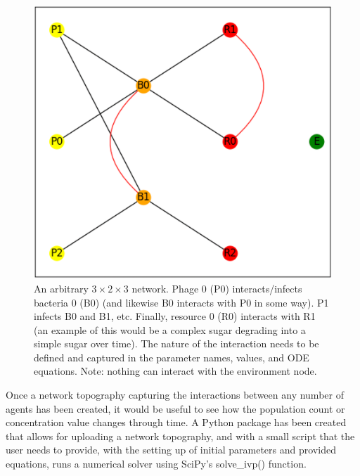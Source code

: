 \begin{figure}
    \centering
    \includegraphics[width=0.5\linewidth]{Chapters/Screenshots/example_network.png}
    \caption{An arbitrary $3\times2\times3$ network. Phage 0 (P0) interacts/infects bacteria 0 (B0) (and likewise B0 interacts with P0 in some way). P1 infects B0 and B1, etc. Finally, resource 0 (R0) interacts with R1 (an example of this would be a complex sugar degrading into a simple sugar over time). The nature of the interaction needs to be defined and captured in the parameter names, values, and ODE equations. Note: nothing can interact with the environment node.}
    \label{fig:ss:example_network}
\end{figure}
 
Once a network topography capturing the interactions between any number of agents has been created, it would be useful to see how the population count or concentration value changes through time. 
A Python package has been created that allows for uploading a network topography, and with a small script that the user needs to provide, with the setting up of initial parameters and provided equations, runs a numerical solver using SciPy's solve\_ivp() function.  